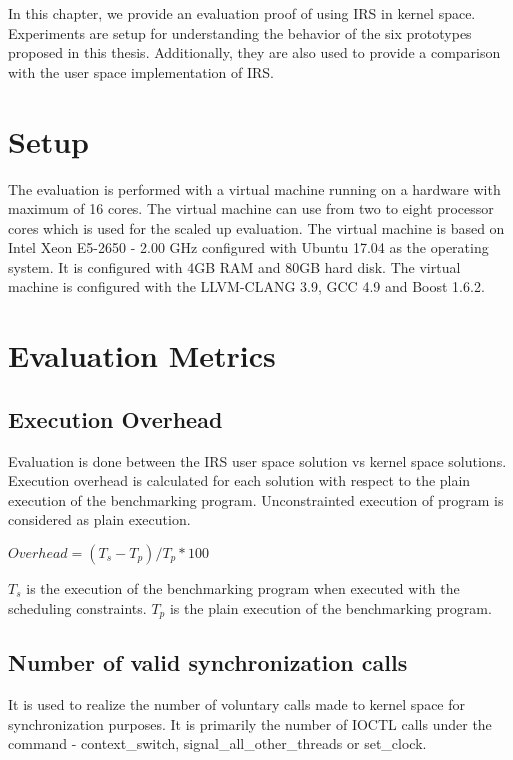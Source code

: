 In this chapter, we provide an evaluation proof of using IRS in kernel space. 
Experiments are setup for understanding the behavior of the six prototypes proposed in this thesis. 
Additionally, they are also used to provide a comparison with the user space implementation of IRS. 

\section{Setup}

The evaluation is performed with a virtual machine running on a hardware with maximum of 16 cores. 
The virtual machine can use from two to eight processor cores which is used for the scaled up evaluation. 
The virtual machine is based on Intel Xeon E5-2650 - 2.00 GHz configured with Ubuntu 17.04 as the operating system. 
It is configured with 4GB RAM and 80GB hard disk. 
The virtual machine is configured with the LLVM-CLANG 3.9, GCC 4.9 and Boost 1.6.2.


\section{Evaluation Metrics}

\subsection{Execution Overhead}

Evaluation is done between the IRS user space solution vs kernel space solutions. 
Execution overhead is calculated for each solution with respect to the plain execution of the benchmarking program. 
Unconstrainted execution of program is considered as plain execution. 

$Overhead = (T_s - T_p)/T_p * 100$

$T_s$ is the execution of the benchmarking program when executed with the scheduling constraints. 
$T_p$ is the plain execution of the benchmarking program. 

\subsection{Number of valid synchronization calls} 

It is used to realize the number of voluntary calls made to kernel space for synchronization purposes. 
It is primarily the number of IOCTL calls under the command - context\_switch, signal\_all\_other\_threads or set\_clock.



